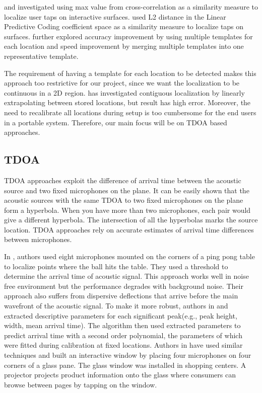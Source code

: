 \cite{extended:tusi} and \cite{ltm:pham} investigated using max value from cross-correlation as a similarity measure to localize user taps on interactive surfaces. \cite{ltm:lpc} used L2 distance in the Linear Predictive Coding coefficient space as a similarity measure to localize taps on surfaces. \cite{ltm:tusi2} further explored accuracy improvement by using multiple templates for each location and speed improvement by merging multiple templates into one representative template.

The requirement of having a template for each location to be detected makes this approach too restrictive for our project, since we want the localization to be continuous in a 2D region. \cite{ltm:tusi2} has investigated contiguous localization by linearly extrapolating between stored locations, but result has high error.  Moreover, the need to recalibrate all locations during setup is too cumbersome for the end users in a portable system. Therefore, our main focus will be on TDOA based approaches.

\subsection{TDOA}
TDOA approaches exploit the difference of arrival time between the acoustic source and two fixed microphones on the plane. It can be easily shown that the acoustic sources with the same TDOA to two fixed microphones on the plane form a hyperbola. When you have more than two microphones, each pair would give a different hyperbola. The intersection of all the hyperbolas marks the source location. TDOA approaches rely on accurate estimates of arrival time differences between microphones. 

In \cite{tdoa:ppp}, authors used eight microphones mounted on the corners of a ping pong table to localize points where the ball hits the table. They used a threshold to determine the arrival time of acoustic signal. This approach works well in noise free environment but the performance degrades with background noise. Their approach also suffers from dispersive deflections that arrive before the main wavefront of the acoustic signal. To make it more robust, authors in \cite{tdoa:mit3} and \cite{tdoa:mit4} extracted descriptive parameters for each significant peak(e.g., peak height, width, mean arrival time). The algorithm then used extracted parameters to predict arrival time with a second order polynomial, the parameters of which were fitted during calibration at fixed locations.  Authors in \cite{tdoa:mit5} have used similar techniques and built an interactive window by placing four microphones on four corners of a glass pane. The glass window was installed in shopping centers. A projector projects product information onto the glass where consumers can browse between pages by tapping on the window.

